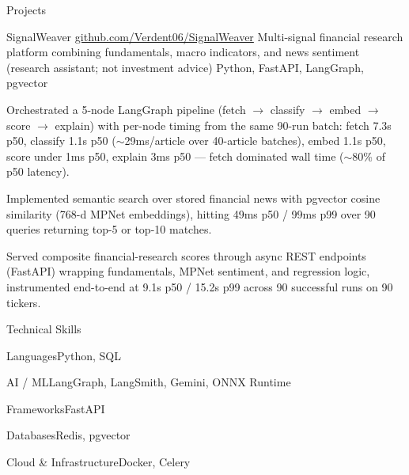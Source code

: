 \documentclass[
	11pt
]{../../../template}
\begin{document}
	\begin{rSection}{P}{rojects}
		\begin{rSectionEntry}
			{SignalWeaver}
			{\href{https://github.com/Verdent06/SignalWeaver}{github.com/Verdent06/SignalWeaver}}
			{Multi-signal financial research platform combining fundamentals, macro indicators, and news sentiment (research assistant; not investment advice)}
			{Python, FastAPI, LangGraph, pgvector}
			{}

			\item Orchestrated a 5-node LangGraph pipeline (fetch $\rightarrow$ classify $\rightarrow$ embed $\rightarrow$ score $\rightarrow$ explain) with per-node timing from the same 90-run batch: fetch 7.3s p50, classify 1.1s p50 ($\sim$29ms/article over 40-article batches), embed 1.1s p50, score under 1ms p50, explain 3ms p50 --- fetch dominated wall time ($\sim$80\% of p50 latency).
			\item Implemented semantic search over stored financial news with pgvector cosine similarity (768-d MPNet embeddings), hitting 49ms p50 / 99ms p99 over 90 queries returning top-5 or top-10 matches.
			\item Served composite financial-research scores through async REST endpoints (FastAPI) wrapping fundamentals, MPNet sentiment, and regression logic, instrumented end-to-end at 9.1s p50 / 15.2s p99 across 90 successful runs on 90 tickers.
		\end{rSectionEntry}
	\end{rSection}

	\begin{rSection}{T}{echnical Skills}
		\begin{rSet}{Languages}{Python, SQL}
		\end{rSet}
		\begin{rSet}{AI / ML}{LangGraph, LangSmith, Gemini, ONNX Runtime}
		\end{rSet}
		\begin{rSet}{Frameworks}{FastAPI}
		\end{rSet}
		\begin{rSet}{Databases}{Redis, pgvector}
		\end{rSet}
		\begin{rSet}{Cloud \& Infrastructure}{Docker, Celery}
		\end{rSet}
	\end{rSection}
\end{document}
